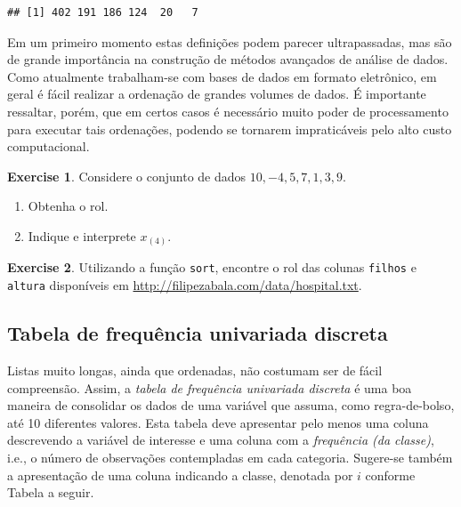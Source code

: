 \documentclass[
]{book}
\providecommand{\tightlist}{%
  \setlength{\itemsep}{0pt}\setlength{\parskip}{0pt}}
\theoremstyle{definition}
\theoremstyle{definition}
\theoremstyle{definition}
\newtheorem{exercise}{Exercise}[chapter]
\theoremstyle{remark}
\begin{document}
\begin{verbatim}
## [1] 402 191 186 124  20   7
\end{verbatim}

Em um primeiro momento estas definições podem parecer ultrapassadas, mas são de grande importância na construção de métodos avançados de análise de dados. Como atualmente trabalham-se com bases de dados em formato eletrônico, em geral é fácil realizar a ordenação de grandes volumes de dados. É importante ressaltar, porém, que em certos casos é necessário muito poder de processamento para executar tais ordenações, podendo se tornarem impraticáveis pelo alto custo computacional.

\begin{exercise}
\protect\hypertarget{exr:rol2}{}{\label{exr:rol2} }Considere o conjunto de dados \(10,-4,5,7,1,3,9\).

\begin{enumerate}
\def\labelenumi{\alph{enumi}.}
\tightlist
\item
  Obtenha o rol.
\item
  Indique e interprete \(x_{(4)}\).
\end{enumerate}
\end{exercise}

\begin{exercise}
\protect\hypertarget{exr:unnamed-chunk-9}{}{\label{exr:unnamed-chunk-9} }Utilizando a função \texttt{sort}, encontre o rol das colunas \texttt{filhos} e \texttt{altura} disponíveis em \url{http://filipezabala.com/data/hospital.txt}.
\end{exercise}

\hypertarget{tab-freq-univ-discr}{%
\subsection{Tabela de frequência univariada discreta}\label{tab-freq-univ-discr}}

Listas muito longas, ainda que ordenadas, não costumam ser de fácil compreensão. Assim, a \emph{tabela de frequência univariada discreta} é uma boa maneira de consolidar os dados de uma variável que assuma, como regra-de-bolso, até 10 diferentes valores. Esta tabela deve apresentar pelo menos uma coluna descrevendo a variável de interesse e uma coluna com a \emph{frequência (da classe)}, i.e., o número de observações contempladas em cada categoria. Sugere-se também a apresentação de uma coluna indicando a classe, denotada por \(i\) conforme Tabela a seguir.
\end{document}
